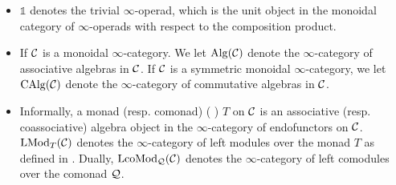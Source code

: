 \begin{itemize}
     
	\item $\mathds{1}$ denotes the trivial $\infty$-operad, which is the unit object in the monoidal category of $\infty$-operads with respect to the composition product.
	\item If ${\mathcal{C}}$ is a monoidal $\infty$-category. We let $\operatorname{Alg}({\mathcal{C}})$ denote the $\infty$-category of associative algebras in ${\mathcal{C}}$.
	If ${\mathcal{C}}$ is a symmetric monoidal $\infty$-category, we let $\operatorname{CAlg}({\mathcal{C}})$ denote the 
	$\infty$-category of commutative algebras in ${\mathcal{C}}$.
	\item 
	Informally, a monad (resp. comonad) ( \cite[Definition 4.7.3.2.]{HA}) $T$ on ${\mathcal{C}}$ is an associative (resp. coassociative) algebra object in the $\infty$-category of endofunctors on ${\mathcal{C}}$. 
	$\operatorname{LMod}_{T}({\mathcal{C}})$ denotes the $\infty$-category of left modules over the monad $T$ as defined in \cite[Section 4.2]{HA}. Dually, $\operatorname{LcoMod}_{{\mathcal{Q}}}({\mathcal{C}})$ denotes the $\infty$-category of left comodules over the comonad ${\mathcal{Q}}$.
\end{itemize}